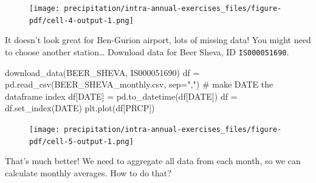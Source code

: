 \documentclass[
  letterpaper,
  DIV=11,
  numbers=noendperiod]{scrreprt}
\newenvironment{Shaded}{\begin{snugshade}}{\end{snugshade}}
\newcommand{\CommentTok}[1]{\textcolor[rgb]{0.37,0.37,0.37}{#1}}
\newcommand{\NormalTok}[1]{\textcolor[rgb]{0.00,0.23,0.31}{#1}}
\newcommand{\OperatorTok}[1]{\textcolor[rgb]{0.37,0.37,0.37}{#1}}
\newcommand{\StringTok}[1]{\textcolor[rgb]{0.13,0.47,0.30}{#1}}
\begin{document}
\begin{figure}[H]

{\centering \texttt{[image: precipitation/intra-annual-exercises\_files/figure-pdf/cell-4-output-1.png]}

}

\end{figure}

It doesn't look great for Ben-Gurion airport, lots of missing data! You
might need to choose another station\ldots{} Download data for Beer
Sheva, ID \texttt{IS000051690}.

\begin{Shaded}
\begin{Highlighting}[]
\NormalTok{download\_data(}\StringTok{\textquotesingle{}BEER\_SHEVA\textquotesingle{}}\NormalTok{, }\StringTok{\textquotesingle{}IS000051690\textquotesingle{}}\NormalTok{)}
\NormalTok{df }\OperatorTok{=}\NormalTok{ pd.read\_csv(}\StringTok{\textquotesingle{}BEER\_SHEVA\_monthly.csv\textquotesingle{}}\NormalTok{, sep}\OperatorTok{=}\StringTok{","}\NormalTok{)}
\CommentTok{\# make \textquotesingle{}DATE\textquotesingle{} the dataframe index}
\NormalTok{df[}\StringTok{\textquotesingle{}DATE\textquotesingle{}}\NormalTok{] }\OperatorTok{=}\NormalTok{ pd.to\_datetime(df[}\StringTok{\textquotesingle{}DATE\textquotesingle{}}\NormalTok{])}
\NormalTok{df }\OperatorTok{=}\NormalTok{ df.set\_index(}\StringTok{\textquotesingle{}DATE\textquotesingle{}}\NormalTok{)}
\NormalTok{plt.plot(df[}\StringTok{\textquotesingle{}PRCP\textquotesingle{}}\NormalTok{])}
\end{Highlighting}
\end{Shaded}

\begin{figure}[H]

{\centering \texttt{[image: precipitation/intra-annual-exercises\_files/figure-pdf/cell-5-output-1.png]}

}

\end{figure}

That's much better! We need to aggregate all data from each month, so we
can calculate monthly averages. How to do that?
\end{document}
